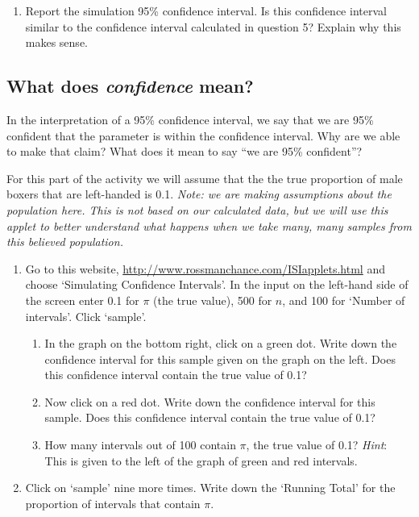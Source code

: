 \documentclass[
]{report}
\providecommand{\tightlist}{%
  \setlength{\itemsep}{0pt}\setlength{\parskip}{0pt}}
\begin{document}
\begin{enumerate}
\def\labelenumi{\arabic{enumi}.}
\setcounter{enumi}{7}
\tightlist
\item
  Report the simulation 95\% confidence interval. Is this confidence interval similar to the confidence interval calculated in question 5? Explain why this makes sense.
\end{enumerate}

\vspace{0.8in}

\hypertarget{what-does-confidence-mean}{%
\subsection*{\texorpdfstring{What does \emph{confidence} mean?}{What does confidence mean?}}\label{what-does-confidence-mean}}

In the interpretation of a 95\% confidence interval, we say that we are 95\% confident that the parameter is within the confidence interval. Why are we able to make that claim? What does it mean to say ``we are 95\% confident''?

For this part of the activity we will assume that the the true proportion of male boxers that are left-handed is 0.1. \emph{Note: we are making assumptions about the population here. This is not based on our calculated data, but we will use this applet to better understand what happens when we take many, many samples from this believed population.}

\begin{enumerate}
\def\labelenumi{\arabic{enumi}.}
\setcounter{enumi}{8}
\item
  Go to this website, \url{http://www.rossmanchance.com/ISIapplets.html} and choose `Simulating Confidence Intervals'. In the input on the left-hand side of the screen enter 0.1 for \(\pi\) (the true value), 500 for \(n\), and 100 for `Number of intervals'. Click `sample'.
  \vspace{1mm}

  \begin{enumerate}
  \def\labelenumii{\alph{enumii}.}
  \item
    In the graph on the bottom right, click on a green dot. Write down the confidence interval for this sample given on the graph on the left. Does this confidence interval contain the true value of 0.1?
    \vspace{0.5in}
  \item
    Now click on a red dot. Write down the confidence interval for this sample. Does this confidence interval contain the true value of 0.1?
    \vspace{0.5in}
  \item
    How many intervals out of 100 contain \(\pi\), the true value of 0.1? \emph{Hint}: This is given to the left of the graph of green and red intervals.
    \vspace{0.5in}
  \end{enumerate}
\item
  Click on `sample' nine more times. Write down the `Running Total' for the proportion of intervals that contain \(\pi\).
\end{enumerate}
\end{document}
